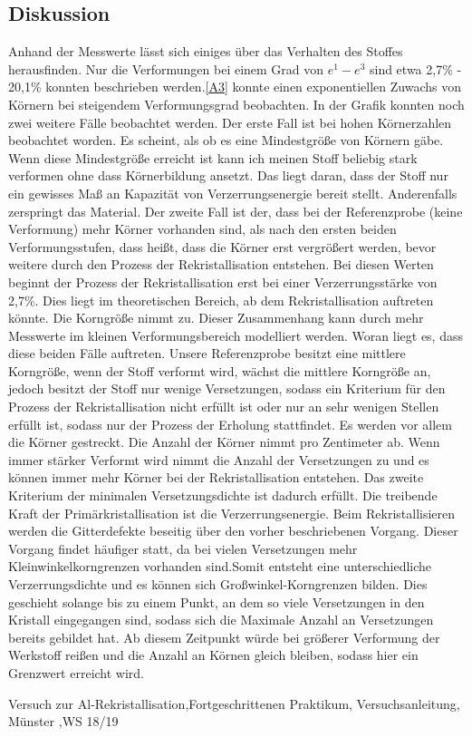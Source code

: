 \documentclass[
	a4paper,
	12pt,
	pagesize,
	ngerman
]{scrartcl}
\begin{document}
\subsection{Diskussion}
Anhand der Messwerte lässt sich einiges über das Verhalten des Stoffes herausfinden. Nur die Verformungen bei einem Grad von $e^1-e^3$ sind etwa 2,7\% - 20,1\% konnten beschrieben werden.\cref{A3} konnte einen exponentiellen Zuwachs von Körnern bei steigendem Verformungsgrad beobachten. In der Grafik konnten noch zwei weitere Fälle beobachtet werden.
Der erste Fall ist bei hohen Körnerzahlen beobachtet worden. Es scheint, als ob es eine Mindestgröße von Körnern gäbe. Wenn diese Mindestgröße erreicht ist kann ich meinen Stoff beliebig stark verformen ohne dass Körnerbildung ansetzt. Das liegt daran, dass der Stoff nur ein gewisses Maß an Kapazität von Verzerrungsenergie bereit stellt. Anderenfalls zerspringt das Material.
Der zweite Fall ist der, dass bei der Referenzprobe (keine Verformung) mehr Körner vorhanden sind, als nach den ersten beiden Verformungsstufen, dass heißt, dass die Körner erst vergrößert werden, bevor weitere durch den Prozess der Rekristallisation entstehen. Bei diesen Werten beginnt der Prozess der Rekristallisation erst bei einer Verzerrungsstärke von 2,7\%. Dies liegt im theoretischen Bereich, ab dem Rekristallisation auftreten könnte. Die Korngröße nimmt zu. Dieser Zusammenhang kann durch mehr Messwerte im kleinen Verformungsbereich modelliert werden.
Woran liegt es, dass diese beiden Fälle auftreten. 
Unsere Referenzprobe besitzt eine mittlere Korngröße, wenn der Stoff verformt wird, wächst die mittlere Korngröße an, jedoch besitzt der Stoff nur wenige Versetzungen, sodass ein Kriterium für den Prozess der Rekristallisation nicht erfüllt ist oder nur an sehr wenigen Stellen erfüllt ist, sodass nur der Prozess der Erholung stattfindet. Es werden vor allem die Körner gestreckt. Die Anzahl der Körner nimmt pro Zentimeter ab. Wenn immer stärker Verformt wird nimmt die Anzahl der Versetzungen zu und es können immer mehr Körner bei der Rekristallisation entstehen. Das zweite Kriterium der minimalen Versetzungsdichte ist dadurch erfüllt. 
Die treibende Kraft der Primärkristallisation ist die Verzerrungsenergie. Beim Rekristallisieren werden die Gitterdefekte beseitig über den vorher beschriebenen Vorgang. Dieser Vorgang findet häufiger statt, da bei vielen Versetzungen mehr Kleinwinkelkorngrenzen vorhanden sind.Somit entsteht eine unterschiedliche Verzerrungsdichte und es können sich Großwinkel-Korngrenzen bilden. Dies geschieht solange bis zu einem Punkt, an dem so viele Versetzungen in den Kristall eingegangen sind, sodass sich die Maximale Anzahl an Versetzungen bereits gebildet hat. Ab diesem Zeitpunkt würde bei größerer Verformung der Werkstoff reißen und die Anzahl an Körnen gleich bleiben, sodass hier ein Grenzwert erreicht wird.

\newpage

\begin{thebibliography}{9}
	Versuch zur Al-Rekristallisation,Fortgeschrittenen Praktikum, Versuchsanleitung, Münster ,WS 18/19
	
\end{thebibliography}
\end{document}
